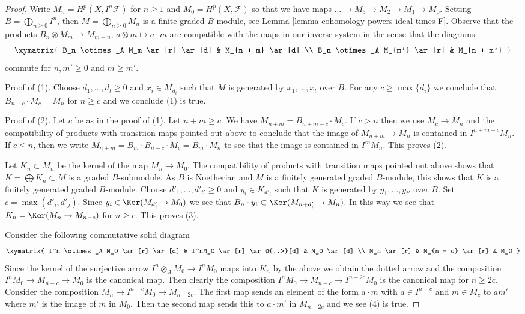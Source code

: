 \begin{proof}
Write $M_n = H^p(X, I^n\mathcal{F})$ for $n \geq 1$ and
$M_0 = H^p(X, \mathcal{F})$ so that we have maps
$\ldots \to M_3 \to M_2 \to M_1 \to M_0$. Setting
$B = \bigoplus_{n \geq 0} I^n$, then $M = \bigoplus_{n \geq 0} M_n$
is a finite graded $B$-module, see
Lemma \ref{lemma-cohomology-powers-ideal-times-F}.
Observe that the products
$B_n \otimes M_m \to M_{m + n}$, $a \otimes m \mapsto a \cdot m$
are compatible with the maps in our inverse system in the sense
that the diagrams
$$
\xymatrix{
B_n \otimes_A M_m \ar[r] \ar[d] & M_{n + m} \ar[d] \\
B_n \otimes_A M_{m'} \ar[r] & M_{n + m'}
}
$$
commute for $n, m' \geq 0$ and $m \geq m'$.

\medskip\noindent
Proof of (1). Choose $d_1, \ldots, d_t \geq 0$ and $x_i \in M_{d_i}$
such that $M$ is generated by $x_1, \ldots, x_t$ over $B$.
For any $c \geq \max\{d_i\}$ we conclude that
$B_{n - c} \cdot M_c = M_n$ for $n \geq c$ and we conclude (1) is true.

\medskip\noindent
Proof of (2). Let $c$ be as in the proof of (1). Let $n + m \geq c$.
We have $M_{n + m} = B_{n + m - c} \cdot M_c$.
If $c > n$ then we use $M_c \to M_n$ and the compatibility of products
with transition maps pointed out above to conclude that
the image of $M_{n + m} \to M_n$ is contained in $I^{n + m - c}M_n$.
If $c \leq n$, then we write $M_{n + m} = B_m \cdot B_{n - c} \cdot M_c =
B_m \cdot M_n$ to see that the image is contained in $I^m M_n$.
This proves (2).

\medskip\noindent
Let $K_n \subset M_n$ be the kernel of the map $M_n \to M_0$. The
compatibility of products with transition maps pointed out above
shows that $K = \bigoplus K_n \subset M$ is a graded $B$-submodule.
As $B$ is Noetherian and $M$ is a finitely generated graded $B$-module,
this shows that $K$ is a finitely generated graded $B$-module.
Choose $d'_1, \ldots, d'_{t'} \geq 0$ and $y_i \in K_{d'_i}$
such that $K$ is generated by $y_1, \ldots, y_{t'}$ over $B$.
Set $c = \max(d'_i, d'_j)$. Since $y_i \in \Ker(M_{d'_i} \to M_0)$
we see that $B_n \cdot y_i \subset \Ker(M_{n + d'_i} \to M_n)$.
In this way we see that $K_n = \Ker(M_n \to M_{n - c})$ for $n \geq c$.
This proves (3).

\medskip\noindent
Consider the following commutative solid diagram
$$
\xymatrix{
I^n \otimes_A M_0 \ar[r] \ar[d] &
I^nM_0 \ar[r] \ar@{..>}[d] &
M_0 \ar[d] \\
M_n \ar[r] &
M_{n - c} \ar[r] &
M_0
}
$$
Since the kernel of the surjective arrow $I^n \otimes_A M_0 \to I^nM_0$
maps into $K_n$ by the above we obtain the dotted arrow and the
composition $I^nM_0 \to M_{n - c} \to M_0$ is the canonical map.
Then clearly the composition $I^nM_0 \to M_{n - c} \to I^{n - 2c}M_0$
is the canonical map for $n \geq 2c$. Consider the composition
$M_n \to I^{n - c}M_0 \to M_{n - 2c}$. The first map
sends an element of the form $a \cdot m$
with $a \in I^{n - c}$ and $m \in M_c$
to $a m'$ where $m'$ is the image of $m$ in $M_0$.
Then the second map sends this to $a \cdot m'$ in $M_{n - 2c}$ and
we see (4) is true.


\end{proof}
